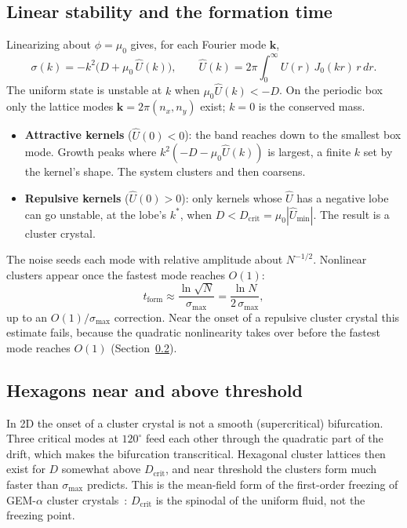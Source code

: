 \documentclass[11pt]{article}
\newcommand{\Uh}{\hat U}
\newcommand{\tf}{t_{\mathrm{form}}}
\begin{document}
\subsection{Linear stability and the formation time}
Linearizing about $\phi=\mu_0$ gives, for each Fourier mode $\mathbf k$,
\begin{equation}
  \sigma(k) = -k^2\bigl(D + \mu_0\,\Uh(k)\bigr), \qquad
  \Uh(k) = 2\pi\int_0^\infty U(r)\,J_0(kr)\,r\,dr .
\end{equation}
The uniform state is unstable at $k$ when $\mu_0\Uh(k) < -D$. On the periodic
box only the lattice modes $\mathbf k = 2\pi(n_x,n_y)$ exist; $k=0$ is the
conserved mass.
\begin{itemize}
  \item \textbf{Attractive kernels} ($\Uh(0)<0$): the band reaches down to the
        smallest box mode. Growth peaks where $k^2(-D-\mu_0\Uh(k))$ is
        largest, a finite $k$ set by the kernel's shape. The system clusters
        and then coarsens.
  \item \textbf{Repulsive kernels} ($\Uh(0)>0$): only kernels whose $\Uh$ has
        a negative lobe can go unstable, at the lobe's $k^*$, when
        $D<D_{\mathrm{crit}}=\mu_0|\Uh_{\min}|$. The result is a cluster
        crystal.
\end{itemize}
The noise seeds each mode with relative amplitude about $N^{-1/2}$. Nonlinear
clusters appear once the fastest mode reaches $O(1)$:
\begin{equation}
  \tf \approx \frac{\ln\sqrt N}{\sigma_{\max}} = \frac{\ln N}{2\,\sigma_{\max}} ,
\end{equation}
up to an $O(1)/\sigma_{\max}$ correction. Near the onset of a repulsive
cluster crystal this estimate fails, because the quadratic nonlinearity takes
over before the fastest mode reaches $O(1)$
(Section~\ref{sec:hex}).

\subsection{Hexagons near and above threshold}\label{sec:hex}
In 2D the onset of a cluster crystal is not a smooth (supercritical)
bifurcation. Three critical modes at $120^\circ$ feed each other through the
quadratic part of the drift, which makes the bifurcation transcritical.
Hexagonal cluster lattices then exist for $D$ somewhat above
$D_{\mathrm{crit}}$, and near threshold the clusters form much faster than
$\sigma_{\max}$ predicts. This is the mean-field form of the first-order
freezing of GEM-$\alpha$ cluster crystals~\cite{mladek}: $D_{\mathrm{crit}}$ is
the spinodal of the uniform fluid, not the freezing point.
\end{document}
